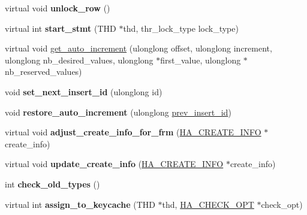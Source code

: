 \begin{DoxyCompactItemize}
virtual void {\bfseries unlock\+\_\+row} ()
\item 
\mbox{\label{classhandler_a90c625117fcff640b7af11e7018519cd}} 
virtual int {\bfseries start\+\_\+stmt} (T\+HD $\ast$thd, thr\+\_\+lock\+\_\+type lock\+\_\+type)
\item 
virtual void \mbox{\hyperlink{classhandler_aaf6af760a4ef09984a5cc1dc58db9a40}{get\+\_\+auto\+\_\+increment}} (ulonglong offset, ulonglong increment, ulonglong nb\+\_\+desired\+\_\+values, ulonglong $\ast$first\+\_\+value, ulonglong $\ast$nb\+\_\+reserved\+\_\+values)
\item 
\mbox{\label{classhandler_ab6f9bf8ee63f3b8312fdc31be3819ede}} 
void {\bfseries set\+\_\+next\+\_\+insert\+\_\+id} (ulonglong id)
\item 
\mbox{\label{classhandler_a15b51670b2497f01f19f587a4a969386}} 
void {\bfseries restore\+\_\+auto\+\_\+increment} (ulonglong \mbox{\hyperlink{handler_8cc_ae9f796d8fbc7dc812557a17547b8e69e}{prev\+\_\+insert\+\_\+id}})
\item 
\mbox{\label{classhandler_ae15661ad009adb5b5b616928ba57c1a3}} 
virtual void {\bfseries adjust\+\_\+create\+\_\+info\+\_\+for\+\_\+frm} (\mbox{\hyperlink{structst__ha__create__information}{H\+A\+\_\+\+C\+R\+E\+A\+T\+E\+\_\+\+I\+N\+FO}} $\ast$create\+\_\+info)
\item 
\mbox{\label{classhandler_a58141e7b51aaf97bdf63ea68c411f401}} 
virtual void {\bfseries update\+\_\+create\+\_\+info} (\mbox{\hyperlink{structst__ha__create__information}{H\+A\+\_\+\+C\+R\+E\+A\+T\+E\+\_\+\+I\+N\+FO}} $\ast$create\+\_\+info)
\item 
\mbox{\label{classhandler_a1abc92ca74cd6aca9a6070a186ced4cb}} 
int {\bfseries check\+\_\+old\+\_\+types} ()
\item 
\mbox{\label{classhandler_ab1b5fa7360fc536082f495ee7e09bcba}} 
virtual int {\bfseries assign\+\_\+to\+\_\+keycache} (T\+HD $\ast$thd, \mbox{\hyperlink{structst__ha__check__opt}{H\+A\+\_\+\+C\+H\+E\+C\+K\+\_\+\+O\+PT}} $\ast$check\+\_\+opt)
\item 
\mbox{\label{classhandler_a0061ab331631179647ccdbd71960ba37}} 

\end{DoxyCompactItemize}
